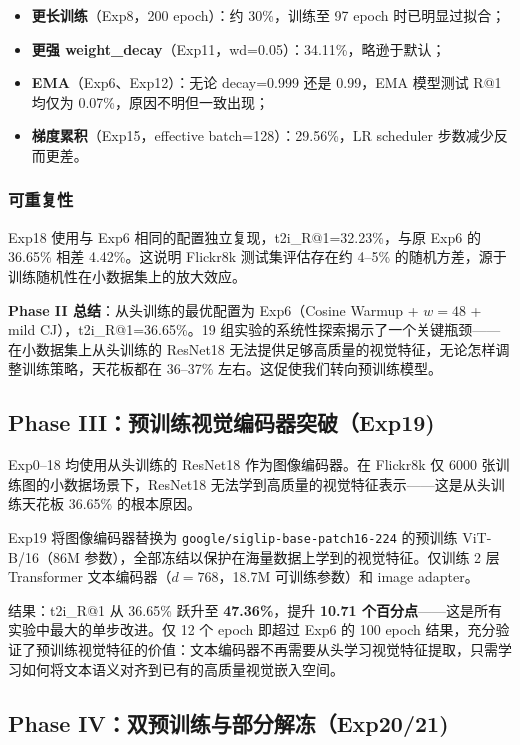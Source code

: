 \documentclass[12pt,a4paper]{article}
\begin{document}
\begin{itemize}[nosep]
    \item \textbf{更长训练}（Exp8，200 epoch）：约 30\%，训练至 97 epoch 时已明显过拟合；
    \item \textbf{更强 weight\_decay}（Exp11，wd=0.05）：34.11\%，略逊于默认；
    \item \textbf{EMA}（Exp6、Exp12）：无论 decay=0.999 还是 0.99，EMA 模型测试 R@1 均仅为 0.07\%，原因不明但一致出现；
    \item \textbf{梯度累积}（Exp15，effective batch=128）：29.56\%，LR scheduler 步数减少反而更差。
\end{itemize}

\subsubsection{可重复性}

Exp18 使用与 Exp6 相同的配置独立复现，t2i\_R@1=32.23\%，与原 Exp6 的 36.65\% 相差 4.42\%。这说明 Flickr8k 测试集评估存在约 4--5\% 的随机方差，源于训练随机性在小数据集上的放大效应。

\textbf{Phase II 总结}：从头训练的最优配置为 Exp6（Cosine Warmup + $w=48$ + mild CJ），t2i\_R@1=36.65\%。19 组实验的系统性探索揭示了一个关键瓶颈——在小数据集上从头训练的 ResNet18 无法提供足够高质量的视觉特征，无论怎样调整训练策略，天花板都在 36--37\% 左右。这促使我们转向预训练模型。

\subsection{Phase III：预训练视觉编码器突破（Exp19)}

Exp0--18 均使用从头训练的 ResNet18 作为图像编码器。在 Flickr8k 仅 6000 张训练图的小数据场景下，ResNet18 无法学到高质量的视觉特征表示——这是从头训练天花板 36.65\% 的根本原因。

Exp19 将图像编码器替换为 \texttt{google/siglip-base-patch16-224} 的预训练 ViT-B/16（86M 参数），全部冻结以保护在海量数据上学到的视觉特征。仅训练 2 层 Transformer 文本编码器（$d=768$，18.7M 可训练参数）和 image adapter。

结果：t2i\_R@1 从 36.65\% 跃升至 \textbf{47.36\%}，提升 \textbf{10.71 个百分点}——这是所有实验中最大的单步改进。仅 12 个 epoch 即超过 Exp6 的 100 epoch 结果，充分验证了预训练视觉特征的价值：文本编码器不再需要从头学习视觉特征提取，只需学习如何将文本语义对齐到已有的高质量视觉嵌入空间。

\subsection{Phase IV：双预训练与部分解冻（Exp20/21)}
\end{document}
